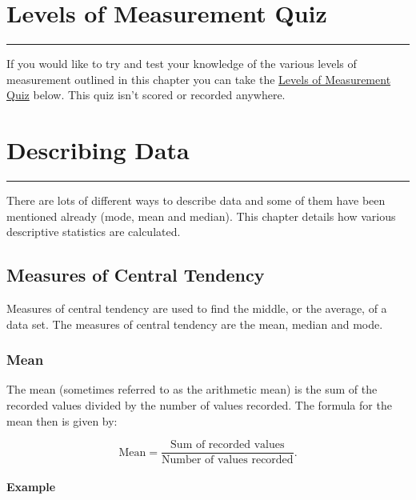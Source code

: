 \documentclass[
]{book}
\begin{document}
\hypertarget{quizone}{%
\chapter{Levels of Measurement Quiz}\label{quizone}}

\begin{center}\rule{0.5\linewidth}{0.5pt}\end{center}

If you would like to try and test your knowledge of the various levels of measurement outlined in this chapter you can take the \href{https://view.genial.ly/62867083cd8fd700184ca06f/presentation-quiz}{Levels of Measurement Quiz} below. This quiz isn't scored or recorded anywhere.

\hypertarget{descdata}{%
\chapter{Describing Data}\label{descdata}}

\begin{center}\rule{0.5\linewidth}{0.5pt}\end{center}

There are lots of different ways to describe data and some of them have been mentioned already (mode, mean and median). This chapter details how various descriptive statistics are calculated.

\hypertarget{measures-of-central-tendency}{%
\section{Measures of Central Tendency}\label{measures-of-central-tendency}}

Measures of central tendency are used to find the middle, or the average, of a data set. The measures of central tendency are the mean, median and mode.

\hypertarget{mean}{%
\subsection{Mean}\label{mean}}

The mean (sometimes referred to as the arithmetic mean) is the sum of the recorded values divided by the number of values recorded. The formula for the mean then is given by:

\[ \textrm{Mean} = \frac{\textrm{Sum of recorded values}}{\textrm{Number of values recorded}}.\]

\hypertarget{example-1}{%
\subsubsection{Example}\label{example-1}}
\end{document}
